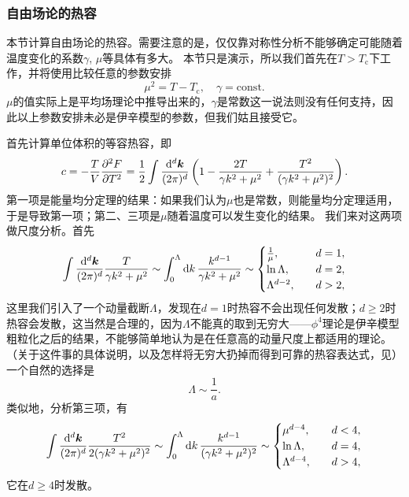 \documentclass[hyperref, UTF8, a4paper]{ctexart}
\newcommand*{\const}{\mathrm{const}}
\renewcommand{\autoref}{\prettyref}
\begin{document}
\subsubsection{自由场论的热容}

本节计算自由场论的热容。需要注意的是，仅仅靠对称性分析不能够确定可能随着温度变化的系数$\gamma$, $\mu$等具体有多大。
本节只是演示，所以我们首先在$T > T_\text{c}$下工作，并将使用比较任意的参数安排
\begin{equation}
    \mu^2 = T - T_\text{c}, \quad \gamma = \const.    
    \label{eq:mf-parameter-assumption}
\end{equation}
$\mu$的值实际上是平均场理论中推导出来的，$\gamma$是常数这一说法则没有任何支持，因此以上参数安排未必是伊辛模型的参数，但我们姑且接受它。

首先计算单位体积的等容热容，即
\begin{equation}
    c = - \frac{T}{V} \pdv[2]{F}{T} = \frac{1}{2} \int \frac{\dd[d]{\vb*{k}}}{(2\pi)^d} \left( 1 - \frac{2T}{\gamma k^2 + \mu^2} + \frac{T^2}{(\gamma k^2 + \mu^2)^2} \right).
\end{equation}
第一项是能量均分定理的结果：如果我们认为$\mu$也是常数，则能量均分定理适用，于是导致第一项；第二、三项是$\mu$随着温度可以发生变化的结果。
我们来对这两项做尺度分析。首先
\[
    \int \frac{\dd[d]{\vb*{k}}}{(2\pi)^d} \frac{T}{\gamma k^2 + \mu^2} \sim \int_0^\Lambda \dd{k} \frac{k^{d-1}}{\gamma k^2 + \mu^2} \sim \begin{cases}
        \frac{1}{\mu}, \quad &d=1, \\
        \ln \Lambda, \quad &d=2, \\
        \Lambda^{d-2}, \quad &d>2,
    \end{cases}
\]
这里我们引入了一个动量截断$\Lambda$，发现在$d=1$时热容不会出现任何发散；$d\geq 2$时热容会发散，这当然是合理的，因为$\Lambda$不能真的取到无穷大——$\phi^4$理论是伊辛模型粗粒化之后的结果，不能够简单地认为是在任意高的动量尺度上都适用的理论。（关于这件事的具体说明，以及怎样将无穷大扔掉而得到可靠的热容表达式，见\autoref{sec:ising-rg}）
一个自然的选择是
\[
    \Lambda \sim \frac{1}{a}.
\]
类似地，分析第三项，有
\[
    \int \frac{\dd[d]{\vb*{k}}}{(2\pi)^d} \frac{T^2}{2(\gamma k^2 + \mu^2)^2} \sim \int_0^\Lambda \dd{k} \frac{k^{d-1}}{(\gamma k^2 + \mu^2)^2} \sim \begin{cases}
        \mu^{d-4}, \quad &d<4, \\
        \ln \Lambda, \quad &d=4, \\
        \Lambda^{d-4}, \quad &d>4,
    \end{cases}
\]
它在$d \geq 4$时发散。
\end{document}
